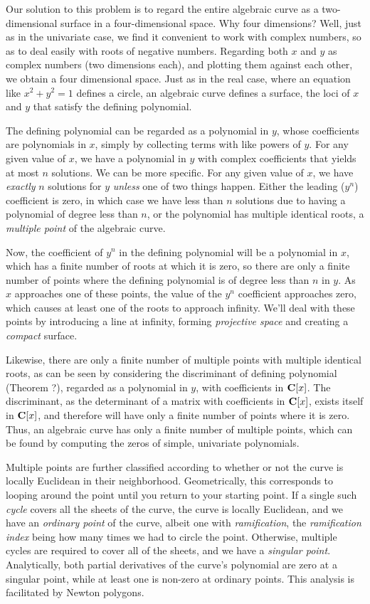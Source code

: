 Our solution to this problem is to regard the entire algebraic curve
as a two-dimensional surface in a four-dimensional space.  Why four
dimensions?  Well, just as in the univariate case, we find it
convenient to work with complex numbers, so as to deal easily with
roots of negative numbers.  Regarding both $x$ and $y$ as complex
numbers (two dimensions each), and plotting them against each other,
we obtain a four dimensional space.  Just as in the real case, where
an equation like $x^2 + y^2 = 1$ defines a circle, an algebraic curve
defines a surface, the loci of $x$ and $y$ that satisfy the defining
polynomial.

The defining polynomial can be regarded as a polynomial in $y$, whose
coefficients are polynomials in $x$, simply by collecting terms with
like powers of $y$.  For any given value of $x$, we have a polynomial
in $y$ with complex coefficients that yields at most $n$ solutions.
We can be more specific.  For any given value of $x$, we have {\it
exactly} $n$ solutions for $y$ {\it unless} one of two things happen.
Either the leading ($y^n$) coefficient is zero, in which case we have
less than $n$ solutions due to having a polynomial of degree less than
$n$, or the polynomial has multiple identical roots, a {\it multiple
point} of the algebraic curve.

Now, the coefficient of $y^n$ in the defining polynomial will be a
polynomial in $x$, which has a finite number of roots at which it is
zero, so there are only a finite number of points where the defining
polynomial is of degree less than $n$ in $y$.  As $x$ approaches one
of these points, the value of the $y^n$ coefficient approaches zero,
which causes at least one of the roots to approach infinity.  We'll
deal with these points by introducing a line at infinity, forming
{\it projective space} and creating a {\it compact} surface.

Likewise, there are only a finite number of multiple points with
multiple identical roots, as can be seen by considering the
discriminant of defining polynomial (Theorem ?), regarded as a
polynomial in $y$, with coefficients in ${\bf C}[x]$.  The
discriminant, as the determinant of a matrix with coefficients in
${\bf C}[x]$, exists itself in ${\bf C}[x]$, and therefore will have
only a finite number of points where it is zero.  Thus, an algebraic
curve has only a finite number of multiple points, which can be found
by computing the zeros of simple, univariate polynomials.

Multiple points are further classified according to whether or not the
curve is locally Euclidean in their neighborhood.  Geometrically, this
corresponds to looping around the point until you return to your
starting point.  If a single such {\it cycle} covers all the sheets of
the curve, the curve is locally Euclidean, and we have an {\it
ordinary point} of the curve, albeit one with {\it ramification}, the
{\it ramification index} being how many times we had to circle the
point.  Otherwise, multiple cycles are required to cover all of the
sheets, and we have a {\it singular point}.  Analytically, both
partial derivatives of the curve's polynomial are zero at a singular
point, while at least one is non-zero at ordinary points.  This
analysis is facilitated by Newton polygons.

